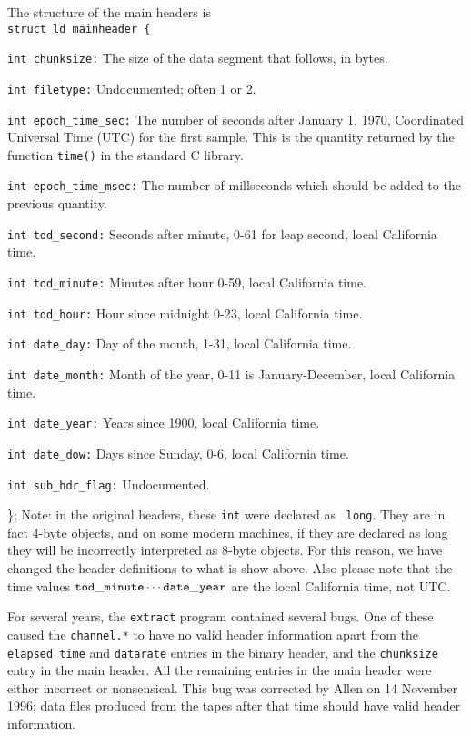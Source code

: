 The structure of the main headers is\\
{\tt struct ld\_mainheader \{}
\begin{description}
  \item{\tt  int chunksize:} The size of the data segment that follows, in bytes.
  \item{\tt  int filetype:} Undocumented; often 1 or 2.
  \item{\tt  int epoch\_time\_sec:} The number of seconds after January 1, 1970, Coordinated
   Universal Time (UTC) for the first sample.  This is the quantity returned by the function {\tt time()} in the
   standard C library.  
  \item{\tt  int epoch\_time\_msec:} The number of millseconds which should be added to the previous quantity.
  \item{\tt  int tod\_second:} Seconds after minute, 0-61 for leap second, local California time.
  \item{\tt  int tod\_minute:} Minutes after hour 0-59, local California time.
  \item{\tt  int tod\_hour:} Hour since midnight 0-23, local California time.
  \item{\tt  int date\_day:} Day of the month, 1-31, local California time.
  \item{\tt  int date\_month:} Month of the year, 0-11 is January-December, local California time.
  \item{\tt  int date\_year:} Years since 1900, local California time.
  \item{\tt  int date\_dow:} Days since Sunday, 0-6, local California time.
  \item{\tt  int sub\_hdr\_flag:} Undocumented.
\end{description}
\};
Note: in the original headers, these {\tt int} were declared as {\tt
long}.  They are in fact 4-byte objects, and on some modern machines,
if they are declared as long they will be incorrectly interpreted as
8-byte objects.  For this reason, we have changed the header definitions
to what is show above.  Also please note that the time values ${\tt tod\_minute}
\cdots {\tt date\_year}$ are the local California time, not UTC.

For several years, the {\tt extract} program contained several bugs.
One of these caused the {\tt channel.*} to have no valid header
information apart from the {\tt elapsed time} and {\tt datarate}
entries in the binary header, and the {\tt chunksize} entry in the main
header.  All the remaining entries in the main header were either
incorrect or nonsensical.  This bug was corrected by Allen on 14
November 1996; data files produced from the tapes after that time should
have valid header information.

